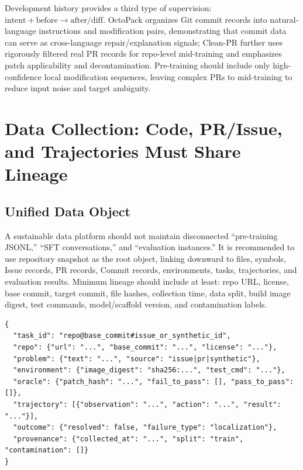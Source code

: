 \documentclass[10pt,a4paper,UTF8,fontset=none]{ctexart}
\newcommand{\ident}[1]{{\rmfamily #1}}
\begin{document}
Development history provides a third type of supervision: $\text{intent} + \text{before} \rightarrow \text{after/diff}$. OctoPack organizes Git commit records into natural-language instructions and modification pairs, demonstrating that commit data can serve as cross-language repair/explanation signals\cite{muennighoff2023octopack}; Clean-PR further uses rigorously filtered real PR records for repo-level mid-training and emphasizes patch applicability and decontamination\cite{lo2026cleanpr}. Pre-training should include only high-confidence local modification sequences, leaving complex PRs to mid-training to reduce input noise and target ambiguity.

\section{Data Collection: Code, PR/Issue, and Trajectories Must Share Lineage}

\subsection{Unified Data Object}

A sustainable data platform should not maintain disconnected ``pre-training JSONL,'' ``SFT conversations,'' and ``evaluation instances.'' It is recommended to use \ident{repository snapshot} as the root object, linking downward to files, symbols, Issue records, PR records, Commit records, environments, tasks, trajectories, and evaluation results. Minimum lineage should include at least: repo URL, license, base commit, target commit, file hashes, collection time, data split, build image digest, test commands, model/scaffold version, and contamination labels.

\begin{lstlisting}[style=codeblock,caption={Recommended Unified Task and Trajectory Record (Illustrative)},label={lst:schema}]
{
  "task_id": "repo@base_commit#issue_or_synthetic_id",
  "repo": {"url": "...", "base_commit": "...", "license": "..."},
  "problem": {"text": "...", "source": "issue|pr|synthetic"},
  "environment": {"image_digest": "sha256:...", "test_cmd": "..."},
  "oracle": {"patch_hash": "...", "fail_to_pass": [], "pass_to_pass": []},
  "trajectory": [{"observation": "...", "action": "...", "result": "..."}],
  "outcome": {"resolved": false, "failure_type": "localization"},
  "provenance": {"collected_at": "...", "split": "train", "contamination": []}
}
\end{lstlisting}
\end{document}
